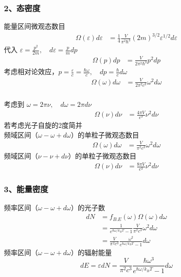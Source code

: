 \begin{frame}
  \frametitle{ 2、态密度}
   能量区间微观态数目 
   \[ 
    \begin{aligned}
      \Omega (\varepsilon) d \varepsilon  
      &=\frac{1}{4} \frac{V}{\pi ^2 \hbar^3} (2m)^{3/2} \varepsilon^{1/2} d \varepsilon 
    \end{aligned}
     \] 
    代入 $\varepsilon = \frac{p^2}{2m}, \quad d \varepsilon = \frac{p}{m} dp $   
    \[ 
      \begin{aligned}
        \Omega (p) d p 
        &= \frac{V}{ 2 \pi ^2 \hbar^3} p^2  dp
      \end{aligned}
       \]
    考虑相对论效应，$p = \frac{\varepsilon}{c} =  \frac{\hbar\omega}{c}, \quad dp = \frac{\hbar}{c} d\omega$
    \[ 
    \begin{aligned}
         \Omega (\omega) d \omega 
         &= \frac{V}{2\pi ^2c^3} \omega^2  d \omega
       \end{aligned}
    \]       
\end{frame} 

\begin{frame}
  \frametitle{}
  考虑到 $\omega = 2 \pi \nu, \quad d \omega = 2 \pi d\nu $
\[ 
\begin{aligned}
  \Omega (\nu) d \nu 
  &= \frac{4\pi V}{c^3} \nu^2  d \nu
\end{aligned}
 \]
 若考虑光子自旋的2度简并\\
 频域区间（$\omega - \omega + d \omega$）的单粒子微观态数目
 \[ 
    \begin{aligned}
         \Omega (\omega) d \omega 
         &= \frac{V}{\pi ^2c^3} \omega^2  d \omega
       \end{aligned}
    \]
  频域区间（$\nu - \nu + d \nu$）的单粒子微观态数目
  \[ 
\begin{aligned}
  \Omega (\nu) d \nu 
  &= \frac{8\pi V}{c^3} \nu^2  d \nu
\end{aligned}
 \]
\end{frame} 

\begin{frame}
  \frametitle{ 3、能量密度}
  频率区间（$\omega - \omega + d \omega$）的光子数
\[ \begin{aligned} 
  dN &= f_{B.E} (\omega) \Omega (\omega) d \omega  \\
  &= \frac{1}{e^{\hbar \omega /k_B T}-1} \frac{V}{\pi ^2c^3} \omega^2  d \omega \\ 
  &=  \frac{V}{\pi ^2c^3} \frac{\omega^2}{e^{\hbar \omega /k_B T}-1} d \omega 
\end{aligned}\]
频率区间（$\omega - \omega + d \omega$）的辐射能量
\[ d E = \varepsilon dN = \frac{ V}{\pi ^2c^3} \frac{\hbar\omega^3}{e^{\hbar \omega /k_B T}-1} d \omega\]
\end{frame} 

